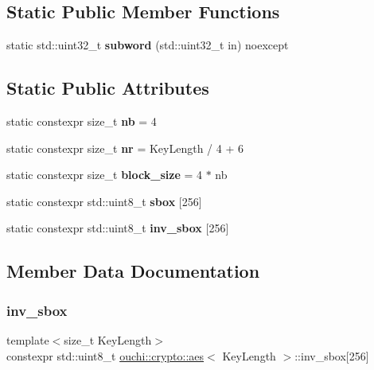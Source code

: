 \subsection*{Static Public Member Functions}
\begin{DoxyCompactItemize}
\item 
\mbox{\label{structouchi_1_1crypto_1_1aes_ae6d3476b9a44a04c9b8aab720b1a1270}} 
static std\+::uint32\+\_\+t {\bfseries subword} (std\+::uint32\+\_\+t in) noexcept
\end{DoxyCompactItemize}
\subsection*{Static Public Attributes}
\begin{DoxyCompactItemize}
\item 
\mbox{\label{structouchi_1_1crypto_1_1aes_a1fecc84b0319953aa93a1bda7f945ad1}} 
static constexpr size\+\_\+t {\bfseries nb} = 4
\item 
\mbox{\label{structouchi_1_1crypto_1_1aes_af9f7c9138f8cbd8b3fb33fc86cdfe0b9}} 
static constexpr size\+\_\+t {\bfseries nr} = Key\+Length / 4 + 6
\item 
\mbox{\label{structouchi_1_1crypto_1_1aes_ad04f6ad971f2b86c949deabe905e2db7}} 
static constexpr size\+\_\+t {\bfseries block\+\_\+size} = 4 $\ast$ nb
\item 
static constexpr std\+::uint8\+\_\+t {\bfseries sbox} \mbox{[}256\mbox{]}
\item 
static constexpr std\+::uint8\+\_\+t {\bfseries inv\+\_\+sbox} \mbox{[}256\mbox{]}
\end{DoxyCompactItemize}


\subsection{Member Data Documentation}
\mbox{\label{structouchi_1_1crypto_1_1aes_a3f93c1df036c549c15b897d98c938837}} 
\subsubsection{\texorpdfstring{inv\_sbox}{inv\_sbox}}
{\footnotesize\ttfamily template$<$size\+\_\+t Key\+Length$>$ \\
constexpr std\+::uint8\+\_\+t \mbox{\hyperlink{structouchi_1_1crypto_1_1aes}{ouchi\+::crypto\+::aes}}$<$ Key\+Length $>$\+::inv\+\_\+sbox\mbox{[}256\mbox{]}\hspace{0.3cm}{\ttfamily [static]}}

